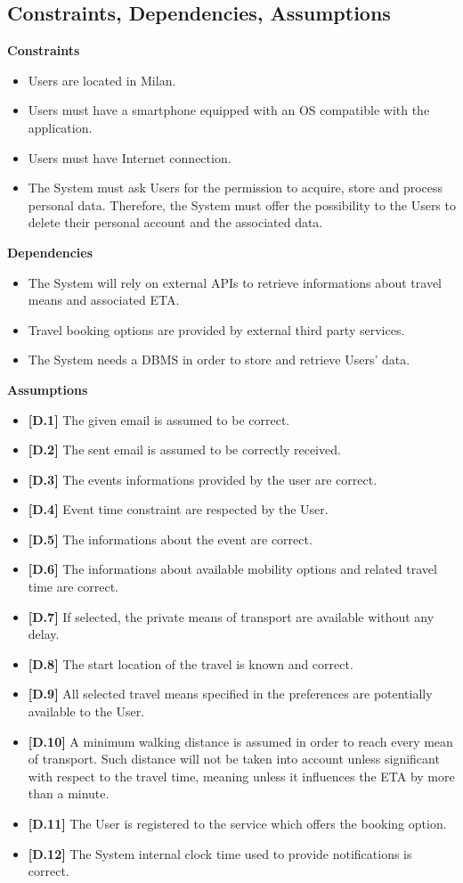 \subsection{Constraints, Dependencies, Assumptions}
\textbf{Constraints}
\begin{itemize}
	\item Users are located in Milan.
	\item Users must have a smartphone equipped with an OS compatible with the application.  
	\item Users must have Internet connection.
	\item The System must ask Users for the permission to acquire, store and process personal data. Therefore, the System must offer the possibility to the Users to delete their personal account and the associated data.
\end{itemize}

\noindent \textbf{Dependencies}
\begin{itemize}
	\item The System will rely on external APIs to retrieve informations about travel means and associated ETA. 
	\item Travel booking options are provided by external third party services.
	\item The System needs a DBMS in order to store and retrieve Users' data.
\end{itemize}

\noindent \textbf{Assumptions}
\begin{itemize}
	\item \textbf{[D.1]} The given email is assumed to be correct.
	\item \textbf{[D.2]} The sent email is assumed to be correctly received.
	\item \textbf{[D.3]} The events informations provided by the user are correct.
	\item\textbf{[D.4]} Event time constraint are respected by the User.
	\item \textbf{[D.5]} The informations about the event are correct.
	\item \textbf{[D.6]} The informations about available mobility options and related travel time are correct.
	\item \textbf{[D.7]} If selected, the private means of transport are available without any delay.
	\item \textbf{[D.8]} The start location of the travel is known and correct.
	\item \textbf{[D.9]} All selected travel means specified in the preferences are potentially available to the User.
	\item \textbf{[D.10]} A minimum walking distance is assumed in order to reach every mean of transport. Such distance will not be taken into account unless significant with respect to the travel time, meaning unless it influences the ETA by more than a minute.
	\item \textbf{[D.11]} The User is registered to the service which offers the booking option.
	\item \textbf{[D.12]} The System internal clock time used to provide notifications is correct.
\end{itemize}
